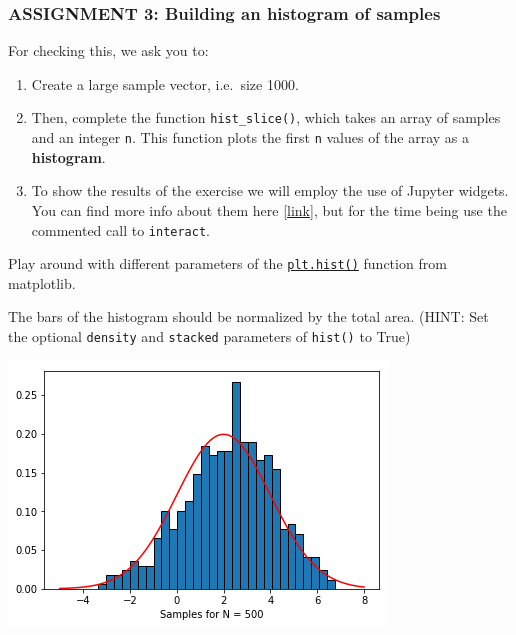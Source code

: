 \documentclass[11pt]{article}
\begin{document}
    \hypertarget{assignment-3-building-an-histogram-of-samples}{%
\subsubsection{\texorpdfstring{\textbf{{ASSIGNMENT 3: Building an
histogram of
samples}}}{ASSIGNMENT 3: Building an histogram of samples}}\label{assignment-3-building-an-histogram-of-samples}}

For checking this, we ask you to:

\begin{enumerate}
\def\labelenumi{\arabic{enumi}.}
\item
  Create a large sample vector, i.e.~size 1000.
\item
  Then, complete the function \texttt{hist\_slice()}, which takes an
  array of samples and an integer \texttt{n}. This function plots the
  first \texttt{n} values of the array as a \textbf{histogram}.
\item
  To show the results of the exercise we will employ the use of Jupyter
  widgets. You can find more info about them here
  \href{https://ipywidgets.readthedocs.io/en/latest/index.html}{{[}link{]}},
  but for the time being use the commented call to \texttt{interact}.
\end{enumerate}

Play around with different parameters of the
\href{https://matplotlib.org/api/_as_gen/matplotlib.pyplot.hist.html?highlight=hist\#matplotlib.pyplot.hist}{\texttt{plt.hist()}}
function from matplotlib.

The bars of the histogram should be normalized by the total area. (HINT:
Set the optional \texttt{density} and \texttt{stacked} parameters of
\texttt{hist()} to True)

\includegraphics{images/fig2-1-4.png}
\end{document}
